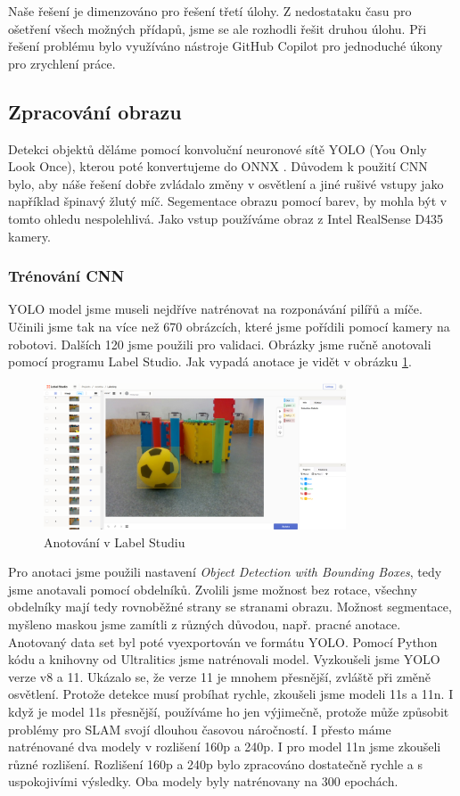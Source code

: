 \documentclass[a4paper,12pt]{article}
\begin{document}
Naše řešení je dimenzováno pro řešení třetí úlohy. Z nedostataku času pro ošetření všech možných přídapů, jsme se ale rozhodli řešit druhou úlohu. 
Při řešení problému bylo využíváno nástroje GitHub Copilot pro jednoduché úkony pro zrychlení práce. 
\subsection{Zpracování obrazu}
Detekci objektů děláme pomocí konvoluční neuronové sítě YOLO \cite{YOLO} (You Only Look Once), kterou poté konvertujeme do ONNX \cite{ONNX}. Důvodem k použití CNN bylo, aby náše řešení dobře zvládalo změny v osvětlení a jiné rušivé vstupy jako například špinavý žlutý míč. Segementace obrazu pomocí barev, by mohla být v tomto ohledu nespolehlivá. Jako vstup používáme obraz z Intel RealSense D435 kamery.
\subsubsection{Trénování CNN}
YOLO model jsme museli nejdříve natrénovat na rozponávání pilířů a míče. Učinili jsme tak na více než 670 obrázcích,
které jsme pořídili pomocí kamery na robotovi. Dalších 120 jsme použili pro validaci. Obrázky jsme ručně anotovali pomocí programu Label Studio. Jak vypadá anotace je vidět v obrázku \ref{fig:label_studio}.
\begin{figure}[H]
    \centering
    \includegraphics[width=0.8\textwidth]{pictures/label_studio.png}
    \caption{Anotování v Label Studiu}
    \label{fig:label_studio}	
\end{figure}
Pro anotaci jsme použili nastavení \textit{Object Detection with Bounding Boxes}, tedy jsme anotavali pomocí obdelníků. Zvolili jsme možnost bez rotace, všechny obdelníky mají tedy rovnoběžné strany se stranami obrazu. 
Možnost segmentace, myšleno maskou jsme zamítli z různých důvodou, např. pracné anotace. 
Anotovaný data set byl poté vyexportován ve formátu YOLO.
Pomocí Python kódu a knihovny od Ultralitics \cite{Ultralitics} jsme natrénovali model. Vyzkoušeli jsme YOLO verze v8 a 11. Ukázalo se, že verze 11 je mnohem přesnější, zvláště při změně osvětlení. 
Protože detekce musí probíhat rychle, zkoušeli jsme modeli 11s a 11n. I když je model 11s přesnější, používáme ho jen výjimečně, protože může způsobit problémy pro SLAM svojí dlouhou časovou náročností. I přesto máme natrénované dva modely v rozlišení 160p a 240p.
I pro model 11n jsme zkoušeli různé rozlišení. Rozlišení 160p a 240p bylo zpracováno dostatečně rychle a s uspokojivími výsledky. Oba modely byly natrénovany na 300 epochách.
\end{document}
